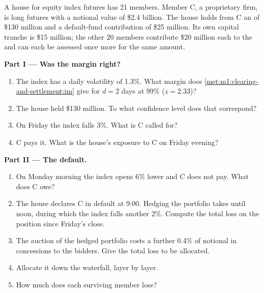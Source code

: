 \begin{problem}\label{pb:m1:clearing-and-settlement:1}
A  house for equity index futures has 21 members. Member C, a
proprietary firm, is long futures with a notional value of \$2.4 billion. The
 house holds from C an  of \$130 million and a
default-fund contribution of \$25 million. Its own capital tranche is \$15
million; the other 20 members contribute \$20 million each to the  and can each be assessed once more for the same amount.

\medskip\noindent\textbf{Part I --- Was the margin right?}
\begin{enumerate}
\item The index has a daily volatility of 1.3\%. What margin does
\cref{met:m1:clearing-and-settlement:im} give for $d = 2$ days at 99\%
($z = 2.33$)?
\item The  house held \$130 million. To what confidence level does
that correspond?
\item On Friday the index falls 3\%. What  is C called for?
\item C pays it. What is the  house's exposure to C on Friday
evening?
\end{enumerate}

\medskip\noindent\textbf{Part II --- The default.}
\begin{enumerate}[resume]
\item On Monday morning the index opens 6\% lower and C does not pay.
What does C owe?
\item The  house declares C in default at 9:00. Hedging the
portfolio takes until noon, during which the index falls another 2\%.
Compute the total loss on the position since Friday's close.
\item The auction of the hedged portfolio costs a further 0.4\% of notional
in concessions to the bidders. Give the total loss to be allocated.
\item Allocate it down the waterfall, layer by layer.
\item How much does each surviving member lose?
\end{enumerate}


\end{problem}
